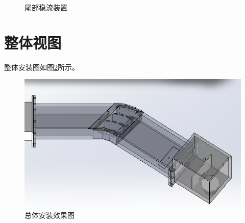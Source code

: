 \documentclass{MyLatex}
\begin{document}
\begin{figure}[H]
\centering
{}
\quad
{}
\caption{尾部稳流装置} \label{fig:尾部}
\end{figure}







\section{整体视图}
整体安装图如图\ref{fig:总装}所示。
\begin{figure}[H]
\centering
\includegraphics[width=0.8\linewidth]{./image/Zpicture/安装效果图.png}
\caption{总体安装效果图} \label{fig:总装}
\end{figure}
\end{document}
